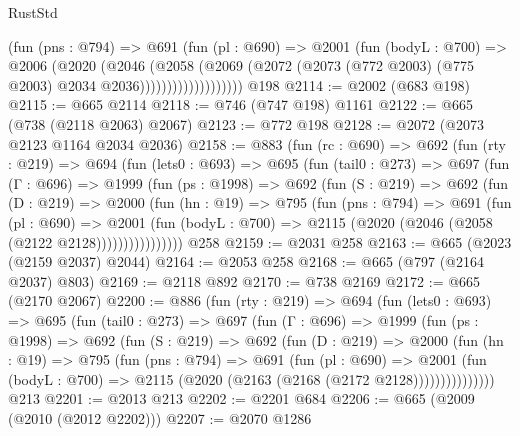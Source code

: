 \begin{lexlean}{RustStd}
\begin{coremodule}
{\begin{coremodule}
{{{{{{{                        (fun (pns : @794) =>
                        @691
                          (fun (pl : @690) =>
                          @2001
                            (fun (bodyL : @700) =>
                            @2006
                              (@2020
                                (@2046
                                  (@2058
                                    (@2069
                                      (@2072
                                        (@2073
                                          (@772 @2003)
                                          (@775 @2003)
                                          @2034
                                          @2036)))))))))))))))))))
    @198
@2114 := @2002 (@683 @198)
@2115 := @665 @2114
@2118 := @746 (@747 @198) @1161
@2122 := @665 (@738 (@2118 @2063) @2067)
@2123 := @772 @198
@2128 := @2072 (@2073 @2123 @1164 @2034 @2036)
@2158 := @883
    (fun (rc : @690) =>
    @692
      (fun (rty : @219) =>
      @694
        (fun (lets0 : @693) =>
        @695
          (fun (tail0 : @273) =>
          @697
            (fun (Γ : @696) =>
            @1999
              (fun (ps : @1998) =>
              @692
                (fun (S : @219) =>
                @692
                  (fun (D : @219) =>
                  @2000
                    (fun (hn : @19) =>
                    @795
                      (fun (pns : @794) =>
                      @691
                        (fun (pl : @690) =>
                        @2001
                          (fun (bodyL : @700) =>
                          @2115 (@2020 (@2046 (@2058 (@2122 @2128))))))))))))))))
    @258
@2159 := @2031 @258
@2163 := @665 (@2023 (@2159 @2037) @2044)
@2164 := @2053 @258
@2168 := @665 (@797 (@2164 @2037) @803)
@2169 := @2118 @892
@2170 := @738 @2169
@2172 := @665 (@2170 @2067)
@2200 := @886
    (fun (rty : @219) =>
    @694
      (fun (lets0 : @693) =>
      @695
        (fun (tail0 : @273) =>
        @697
          (fun (Γ : @696) =>
          @1999
            (fun (ps : @1998) =>
            @692
              (fun (S : @219) =>
              @692
                (fun (D : @219) =>
                @2000
                  (fun (hn : @19) =>
                  @795
                    (fun (pns : @794) =>
                    @691
                      (fun (pl : @690) =>
                      @2001
                        (fun (bodyL : @700) =>
                        @2115 (@2020 (@2163 (@2168 (@2172 @2128)))))))))))))))
    @213
@2201 := @2013 @213
@2202 := @2201 @684
@2206 := @665 (@2009 (@2010 (@2012 @2202)))
@2207 := @2070 @1286
}}}}}}}
\end{coremodule}}
\end{coremodule}
\end{lexlean}
